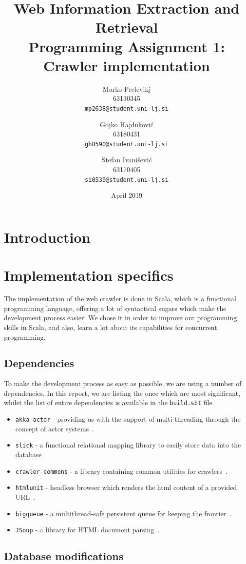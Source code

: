 \documentclass{article}
\title{
	Web Information Extraction and Retrieval\\
	Programming Assignment 1: \\
	Crawler implementation
}
\author{
  Marko Prelevikj\\
  63130345\\
  \texttt{mp2638@student.uni-lj.si}
  \and
  Gojko Hajduković\\
  63180431\\
  \texttt{gh8590@student.uni-lj.si}
  \and
  Stefan Ivanišević\\
  63170405\\
  \texttt{si0539@student.uni-lj.si}
}
\date{April 2019}
\begin{document}
\maketitle

\section{Introduction}

\section{Implementation specifics}

The implementation of the web crawler is done in Scala, which is a functional programming language, offering a lot of syntactical sugars which make the development process easier.
We chose it in order to improve our programming skills in Scala, and also, learn a lot about its capabilities for concurrent programming.

\subsection{Dependencies}

To make the development process as easy as possible, we are using a number of dependencies. In this report, we are listing the once which are most significant, whilst the list of entire dependencies is available in the \texttt{build.sbt} file. 
\begin{itemize}
	\item \texttt{akka-actor} - providing us with the support of multi-threading through the concept of actor systems~\cite{Akka:ActorSystem}.
	\item \texttt{slick} - a functional relational mapping library to easily store data into the database~\cite{Slick}.
	\item \texttt{crawler-commons} - a library containing common utilities for crawlers~\cite{Crawler-commons}.
	\item \texttt{htmlunit} - headless browser which renders the html content of a provided URL~\cite{htmlunit}.
	\item \texttt{bigqueue} - a multithread-safe persistent queue for keeping the frontier~\cite{bigqueue}.
	\item \texttt{JSoup} - a library for HTML document parsing~\cite{jsoup}.
\end{itemize}

\subsection{Database modifications}
\end{document}
